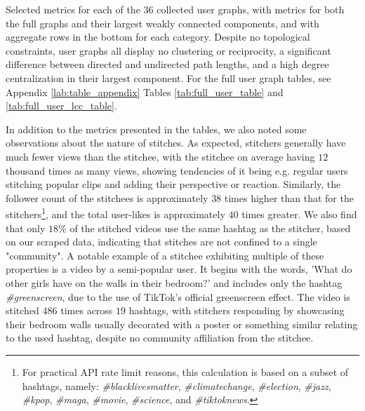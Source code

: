 \begin{table}[H]
    \centering
    \begin{adjustwidth}{-\textwidth}{-\textwidth}
    \centering
    
    \end{adjustwidth}
    \caption{Selected metrics for each of the $36$ collected user graphs, with metrics for both the full graphs and their largest weakly connected components, and with aggregate rows in the bottom for each category. Despite no topological constraints, user graphs all display no clustering or reciprocity, a significant difference between directed and undirected path lengths, and a high degree centralization in their largest component. For the full user graph tables, see Appendix \ref{lab:table_appendix} Tables \ref{tab:full_user_table} and \ref{tab:full_user_lcc_table}.}
    \label{tab:user_table}
\end{table}

In addition to the metrics presented in the tables, we also noted some observations about the nature of stitches. As expected, stitchers generally have much fewer views than the stitchee, with the stitchee on average having $12$ thousand times as many views, showing tendencies of it being e.g. regular users stitching popular clips and adding their perspective or reaction. Similarly, the follower count of the stitchees is approximately $38$ times higher than that for the stitchers\footnote{For practical API rate limit reasons, this calculation is based on a subset of hashtags, namely: \textit{\#blacklivesmatter}, \textit{\#climatechange}, \textit{\#election}, \textit{\#jazz}, \textit{\#kpop}, \textit{\#maga}, \textit{\#movie}, \textit{\#science}, and \textit{\#tiktoknews}.}, and the total user-likes is approximately $40$ times greater. We also find that only $18\%$ of the stitched videos use the same hashtag as the stitcher, based on our scraped data, indicating that stitches are not confined to a single "community". A notable example of a stitchee exhibiting multiple of these properties is a video by a semi-popular user. It begins with the words, 'What do other girls have on the walls in their bedroom?' and includes only the hashtag \textit{\#greenscreen}, due to the use of TikTok's official greenscreen effect. The video is stitched $486$ times across $19$ hashtags, with stitchers responding by showcasing their bedroom walls usually decorated with a poster or something similar relating to the used hashtag, despite no community affiliation from the stitchee.

